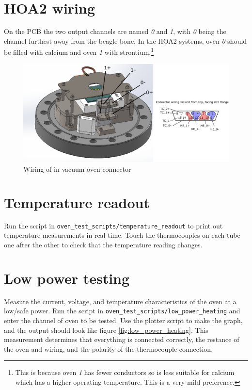 \documentclass{article}
\begin{document}
\section{HOA2 wiring}

On the PCB the two output channels are named \textit{0} and \textit{1}, with \textit{0} being the channel furthest away from the beagle bone. In the HOA2 systems, oven \textit{0} should be filled with calcium and oven \textit{1} with strontium.\footnote{This is because oven \textit{1} has fewer conductors so is less suitable for calcium which has a higher operating temperature. This is a very mild preference.}

\begin{figure}[H]
    \center
    \includegraphics[scale=1]{figures/baseflange_wiring.pdf} 
    \caption{Wiring of in vacuum oven connector}
    \label{fig:baseflange_wiring}
\end{figure}

\section{Temperature readout}
Run the script in \texttt{oven\_test\_scripts/temperature\_readout} to print out temperature measurements in real time. Touch the thermocouples on each tube one after the other to check that the temperature reading changes.

\clearpage
\section{Low power testing}
Measure the current, voltage, and temperature characteristics of the oven at a low/safe power. Run the script in \texttt{oven\_test\_scripts/low\_power\_heating} and enter the channel of oven to be tested. Use the plotter script to make the graph, and the output should look like figure \ref{fig:low_power_heating}.
This measurement determines that everything is connected correctly, the restance of the oven and wiring, and the polarity of the thermocouple connection.
\end{document}
